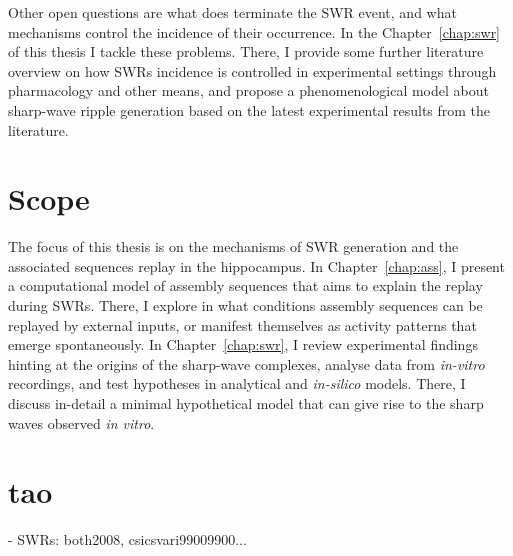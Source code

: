 
    Other open questions are what does terminate the SWR event, and what
    mechanisms control the incidence of their occurrence. In the
    Chapter~\ref{chap:swr} of this thesis I tackle these problems. There, I
    provide some further literature overview on how SWRs incidence is
    controlled in experimental settings through pharmacology and other means,
    and propose a phenomenological model about sharp-wave ripple generation
    based on the latest experimental results from the literature.

\section{Scope}
  The focus of this thesis is on the mechanisms of SWR generation and the
  associated sequences replay in the hippocampus. In Chapter~\ref{chap:ass}, I
  present a computational model of assembly sequences that aims to explain the
  replay during SWRs. There, I explore in what conditions assembly sequences
  can be replayed by external inputs, or manifest themselves as activity
  patterns that emerge spontaneously. In Chapter~\ref{chap:swr}, I review
  experimental findings hinting at the origins of the sharp-wave complexes,
  analyse data from \textit{in-vitro} recordings, and test hypotheses in
  analytical and \textit{in-silico} models. There, I discuss in-detail a
  minimal hypothetical model that can give rise to the sharp waves observed
  \textit{in vitro}. 
  
\section{tao}
  - SWRs: both2008, csicsvari99009900...


